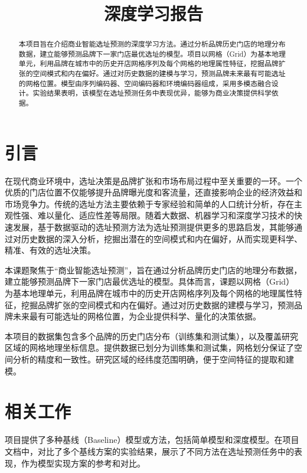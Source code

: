 \documentclass{article}
\title{深度学习报告}
\begin{document}
\maketitle

\begin{abstract}
本项目旨在介绍商业智能选址预测的深度学习方法。通过分析品牌历史门店的地理分布数据，建立能够预测品牌下一家门店最优选址的模型。项目以网格（Grid）为基本地理单元，利用品牌在城市中的历史开店网格序列及每个网格的地理属性特征，挖掘品牌扩张的空间模式和内在偏好。通过对历史数据的建模与学习，预测品牌未来最有可能选址的网格位置。模型由序列编码器、空间编码器和环境编码器组成，采用多模态融合设计。实验结果表明，该模型在选址预测任务中表现优异，能够为商业决策提供科学依据。
\end{abstract}
\newpage

\tableofcontents
\newpage
\section{引言}
在现代商业环境中，选址决策是品牌扩张和市场布局过程中至关重要的一环。一个优质的门店位置不仅能够提升品牌曝光度和客流量，还直接影响企业的经济效益和市场竞争力。传统的选址方法主要依赖于专家经验和简单的人口统计分析，存在主观性强、难以量化、适应性差等局限。随着大数据、机器学习和深度学习技术的快速发展，基于数据驱动的选址预测方法为选址预测提供更多的思路启发，其能够通过对历史数据的深入分析，挖掘出潜在的空间模式和内在偏好，从而实现更科学、精准、有效的选址决策。

本课题聚焦于“商业智能选址预测”，旨在通过分析品牌历史门店的地理分布数据，建立能够预测品牌下一家门店最优选址的模型。具体而言，课题以网格（Grid）为基本地理单元，利用品牌在城市中的历史开店网格序列及每个网格的地理属性特征，挖掘品牌扩张的空间模式和内在偏好。通过对历史数据的建模与学习，预测品牌未来最有可能选址的网格位置，为企业提供科学、量化的决策依据。

本项目的数据集包含多个品牌的历史门店分布（训练集和测试集），以及覆盖研究区域的网格地理坐标信息。提供数据已划分为训练集和测试集，网格划分保证了空间分析的精度和一致性。研究区域的经纬度范围明确，便于空间特征的提取和建模。

\section{相关工作}

项目提供了多种基线（Baseline）模型或方法，包括简单模型和深度模型。在项目文档中，对比了多个基线方案的实验结果，展示了不同方法在选址预测任务中的表现，作为模型实现方案的参考和对比。
\end{document}
